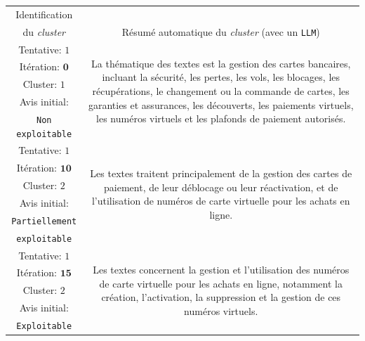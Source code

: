 			\begin{table}[!htb]
				\begin{center}
				\def\arraystretch{0.8}  %
				\begin{tabular}{|c|c|}
				
				\hline
				\rowcolor{colorTableHeader!15}
				Identification
					& 
					\tabularnewline
				\rowcolor{colorTableHeader!15}
				du \textit{cluster}
					& \multirow{-2}{*}{
						Résumé automatique du \textit{cluster} (avec un \texttt{LLM})
					}
					\tabularnewline
					\hline \hline

				{ \footnotesize Tentative: $1$ }
					& \multirow{5}{*}{\parbox{12cm}{
						\footnotesize La thématique des textes est la gestion des cartes bancaires, incluant la sécurité, les pertes, les vols, les blocages, les récupérations, le changement ou la commande de cartes, les garanties et assurances, les découverts, les paiements virtuels, les numéros virtuels et les plafonds de paiement autorisés.
					}}
					\tabularnewline
				{ \footnotesize Itération: $\textbf{0}$ }
					&
					\tabularnewline
				{ \footnotesize Cluster: $1$ }
					&
					\tabularnewline
				{ \footnotesize Avis initial: }
					&
					\tabularnewline
				{ \footnotesize \color{colorDarkPastelRed} \texttt{Non exploitable} }
					&
					\tabularnewline
					\hline
					
				{ \footnotesize Tentative: $1$ }
					& \multirow{6}{*}{\parbox{12cm}{
						\footnotesize Les textes traitent principalement de la gestion des cartes de paiement, de leur déblocage ou leur réactivation, et de l'utilisation de numéros de carte virtuelle pour les achats en ligne.
					}}
					\tabularnewline
				{ \footnotesize Itération: $\textbf{10}$ }
					&
					\tabularnewline
				{ \footnotesize Cluster: $2$ }
					&
					\tabularnewline
				{ \footnotesize Avis initial: }
					&
					\tabularnewline
				{ \footnotesize \color{colorCarrotOrange} \texttt{Partiellement} }
					&
					\tabularnewline
				{ \footnotesize \color{colorCarrotOrange} \texttt{exploitable} }
					&
					\tabularnewline
					\hline
					
				{ \footnotesize Tentative: $1$ }
					& \multirow{5}{*}{\parbox{12cm}{
						\footnotesize Les textes concernent la gestion et l'utilisation des numéros de carte virtuelle pour les achats en ligne, notamment la création, l'activation, la suppression et la gestion de ces numéros virtuels.
					}}
					\tabularnewline
				{ \footnotesize Itération: $\textbf{15}$ }
					&
					\tabularnewline
				{ \footnotesize Cluster: $2$ }
					&
					\tabularnewline
				{ \footnotesize Avis initial: }
					&
					\tabularnewline
				{ \footnotesize \color{colorDarkPastelGreen} \texttt{Exploitable} }
					&
					\tabularnewline
				

\end{tabular}
\end{center}
\end{table}
